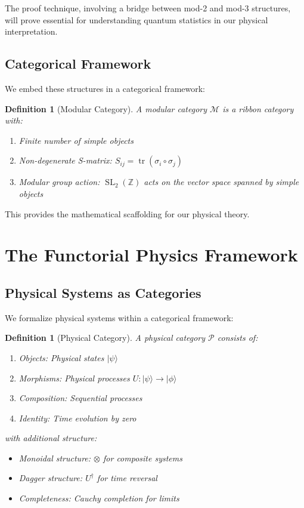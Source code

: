 \documentclass[12pt,a4paper]{article}
\newtheorem{definition}[theorem]{Definition}
\DeclareMathOperator{\SL}{SL}
\DeclareMathOperator{\tr}{tr}
\begin{document}
The proof technique, involving a bridge between mod-2 and mod-3 structures, will prove essential for understanding quantum statistics in our physical interpretation.

\subsection{Categorical Framework}

We embed these structures in a categorical framework:

\begin{definition}[Modular Category]
A modular category $\mathcal{M}$ is a ribbon category with:
\begin{enumerate}
\item Finite number of simple objects
\item Non-degenerate S-matrix: $S_{ij} = \tr(\sigma_i \circ \sigma_j)$
\item Modular group action: $\SL_2(\mathbb{Z})$ acts on the vector space spanned by simple objects
\end{enumerate}
\end{definition}

This provides the mathematical scaffolding for our physical theory.

\section{The Functorial Physics Framework}

\subsection{Physical Systems as Categories}

We formalize physical systems within a categorical framework:

\begin{definition}[Physical Category]
A physical category $\mathcal{P}$ consists of:
\begin{enumerate}
\item Objects: Physical states $|\psi\rangle$
\item Morphisms: Physical processes $U: |\psi\rangle \to |\phi\rangle$
\item Composition: Sequential processes
\item Identity: Time evolution by zero
\end{enumerate}
with additional structure:
\begin{itemize}
\item Monoidal structure: $\otimes$ for composite systems
\item Dagger structure: $U^\dagger$ for time reversal
\item Completeness: Cauchy completion for limits
\end{itemize}
\end{definition}
\end{document}
